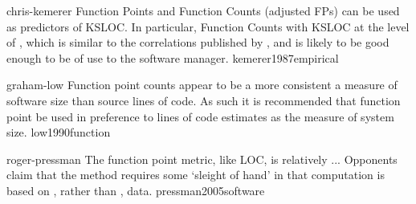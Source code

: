 \documentclass{article}
\begin{document}


\lnQuote
  {chris-kemerer}
  {Function Points and Function Counts (adjusted FPs) can be used as predictors of KSLOC. In particular, Function Counts  with KSLOC at the level of , which is similar to the correlations published by \citet{albrecht1983software}, and is likely to be good enough to be of use to the software manager.}
  {kemerer1987empirical}

\lnQuote
  {graham-low}
  {Function point counts appear to be a more consistent a  measure of software size than source lines of code. As such it is recommended that function point  be used in preference to lines of code estimates as the measure of system size.}
  {low1990function}

\lnQuote
  {roger-pressman}
  {The function point metric, like LOC, is relatively ... Opponents claim that the method requires some `sleight of hand' in that computation is based on , rather than , data.}
  {pressman2005software}
\end{document}
